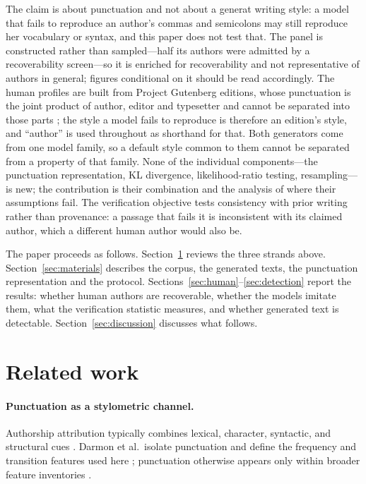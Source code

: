 \documentclass[11pt]{article}
\begin{document}
The claim is about punctuation and not about a generat writing style: a model
that fails to reproduce an author's commas and semicolons may still
reproduce her vocabulary or syntax, and this paper does not test that.
The panel is constructed rather than sampled---half its authors were
admitted by a recoverability screen---so it is enriched for
recoverability and not representative of authors in general; figures
conditional on it should be read accordingly.  The human profiles are
built from Project Gutenberg editions, whose punctuation is the joint
product of author, editor and typesetter and cannot be separated into
those parts \cite{darmon2021}; the style a model fails to reproduce is
therefore an edition's style, and ``author'' is used throughout as
shorthand for that.  Both generators come
from one model family, so a default style common to them cannot be
separated from a property of that family.  None of the individual
components---the punctuation representation, KL divergence,
likelihood-ratio testing, resampling---is new; the contribution is
their combination and the analysis of where their assumptions fail.
The verification objective tests consistency with prior writing rather
than provenance: a passage that fails it is inconsistent with its
claimed author, which a different human author would also be.

The paper proceeds as follows.  Section~\ref{sec:related} reviews the
three strands above.  Section~\ref{sec:materials} describes the corpus,
the generated texts, the punctuation representation and the protocol.
Sections~\ref{sec:human}--\ref{sec:detection} report the results:
whether human authors are recoverable, whether the models imitate them,
what the verification statistic measures, and whether generated text is
detectable.  Section~\ref{sec:discussion} discusses what follows.
\section{Related work}
\label{sec:related}

\paragraph{Punctuation as a stylometric channel.}
Authorship attribution typically combines lexical, character, syntactic, and
structural cues \cite{stamatatos2009}.  Darmon et al.\ isolate punctuation
and define the frequency and transition features used here
\cite{darmon2021}; punctuation otherwise appears only within broader feature
inventories \cite{przystalski2026}. 
\end{document}
